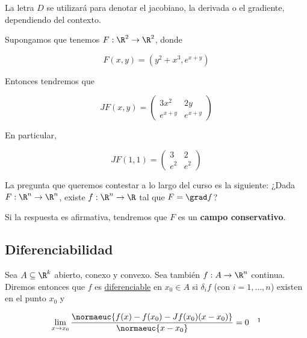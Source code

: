 \begin{nota}
    La letra $D$ se utilizará para denotar el jacobiano, la derivada o el gradiente, dependiendo del contexto.
\end{nota}

\begin{ejem}
    Supongamos que tenemos $F: \R^2 \rightarrow \R^2$, donde
    
    \[
    F(x, y) = \left( y^2 + x^3, e^{x+y} \right)
    \]
    
    Entonces tendremos que
    
    \[
    JF(x,y) =
    \begin{pmatrix}
        3x^2    & 2y \\
        e^{x+y} & e^{x+y}
    \end{pmatrix}
    \]
    
    En particular,
    
    \[
    JF(1,1) =
    \begin{pmatrix}
        3   & 2 \\
        e^2 & e^2
    \end{pmatrix}
    \]
\end{ejem}

\begin{pre}
    La pregunta que queremos contestar a lo largo del curso es la siguiente: ¿Dada $F: \R^n \rightarrow \R^n$, existe $f: \R^n \rightarrow \R$ tal que $F = \grad f$?
    
    Si la respuesta es afirmativa, tendremos que $F$ es un \textbf{campo conservativo}.
\end{pre}

\subsection{Diferenciabilidad}

\begin{defn}
    Sea $A \subseteq \R^k$ abierto, conexo y convexo. Sea también $f: A \rightarrow \R^n$ continua. Diremos entonces que $f$ es \ul{diferenciable} en $x_0 \in A$ si $\delta_i f$ (con $i = 1, \dots, n$) existen en el punto $x_0$ y 
    
    \[
    \lim_{x \to x_0} \frac{\normaeuc{f(x) - f(x_0) - Jf(x_0)(x - x_0)}}{\normaeuc{x - x_0}} = 0 \quad \footnotemark
    \]
\end{defn}

